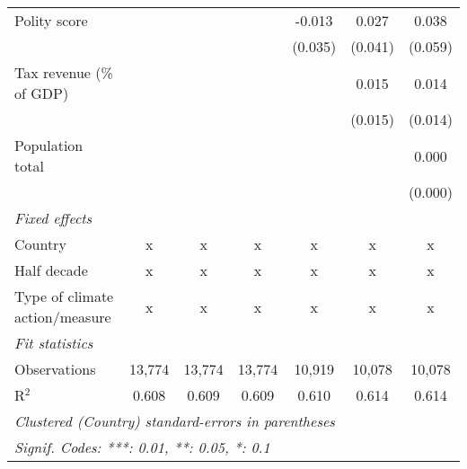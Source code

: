 \begin{tabular}{lcccccc}
   Polity score                                                     &         &               &                & -0.013         & 0.027          & 0.038\\   
                                                                    &         &               &                & (0.035)        & (0.041)        & (0.059)\\   
   Tax revenue (\% of GDP)                                          &         &               &                &                & 0.015          & 0.014\\   
                                                                    &         &               &                &                & (0.015)        & (0.014)\\   
   Population total                                                 &         &               &                &                &                & 0.000\\   
                                                                    &         &               &                &                &                & (0.000)\\   
   \emph{Fixed effects}\\
   Country                                                          & x       & x             & x              & x              & x              & x\\  
   Half decade                                                      & x       & x             & x              & x              & x              & x\\  
   Type of climate action/measure                                   & x       & x             & x              & x              & x              & x\\  
   \midrule \emph{Fit statistics}\\
   Observations                                                     & 13,774  & 13,774        & 13,774         & 10,919         & 10,078         & 10,078\\  
   R$^2$                                                            & 0.608   & 0.609         & 0.609          & 0.610          & 0.614          & 0.614\\  
   \midrule
   \multicolumn{7}{l}{\emph{Clustered (Country) standard-errors in parentheses}}\\
   \multicolumn{7}{l}{\emph{Signif. Codes: ***: 0.01, **: 0.05, *: 0.1}}\\
\end{tabular}
\par\endgroup


